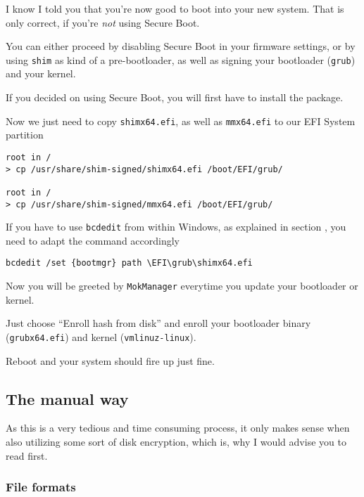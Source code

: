 \documentclass[10pt]{dustdoc}
\begin{document}
I know I told you that you’re now good to boot into your new system.
That is only correct, if you’re \emph{not} using Secure Boot.

You can either proceed by disabling Secure Boot in your firmware settings, or by using \texttt{shim} as kind of a pre-bootloader, as well as signing your bootloader (\texttt{grub}) and your kernel.

If you decided on using Secure Boot, you will first have to install the package.

Now we just need to copy \texttt{shimx64.efi}, as well as \texttt{mmx64.efi} to our EFI System partition

\begin{verbatim}
root in /
> cp /usr/share/shim-signed/shimx64.efi /boot/EFI/grub/

root in /
> cp /usr/share/shim-signed/mmx64.efi /boot/EFI/grub/
\end{verbatim}

\begin{NOTE}
    If you have to use \texttt{bcdedit} from within Windows, as explained in section , you need to adapt the command accordingly

    \begin{verbatim}
bcdedit /set {bootmgr} path \EFI\grub\shimx64.efi
    \end{verbatim}
\end{NOTE}

Now you will be greeted by \texttt{MokManager} everytime you update your bootloader or kernel.

Just choose ``Enroll hash from disk'' and enroll your bootloader binary (\texttt{grubx64.efi}) and kernel (\texttt{vmlinuz-linux}).

Reboot and your system should fire up just fine.

\subsection{The manual way}%
\label{sec:the-manual-way}

\begin{WARNING}
    As this is a very tedious and time consuming process, it only makes sense when also utilizing some sort of disk encryption, which is, why I would advise you to read  first.
\end{WARNING}

\subsubsection{File formats}%
\label{sec:file-formats}
\end{document}
